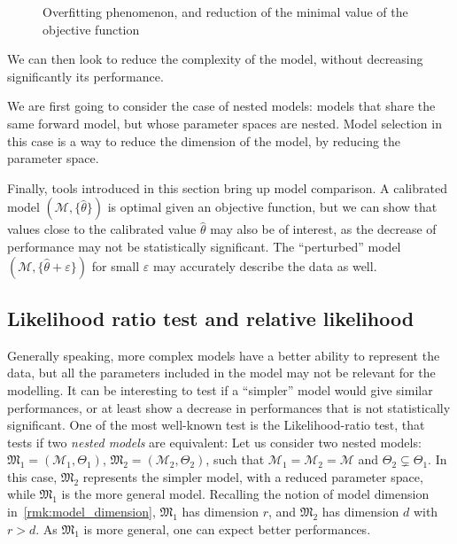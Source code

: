 \documentclass[../../Main_ManuscritThese.tex]{subfiles}
\newcommand\imgpath{/home/victor/acadwriting/Manuscrit/Text/Chapter2/img/}
\begin{document}
\begin{figure}[ht]
  \centering
  
  \caption[Example of overfitting phenomenon]{\label{fig:overfitting} Overfitting phenomenon, and reduction of the minimal value of the objective function}
\end{figure}


We can then look to reduce the complexity of the model, without decreasing significantly its performance.

We are first going to consider the case of nested models: models that share the same forward model, but whose parameter spaces are nested. Model selection in this case is a way to reduce the dimension of the model, by reducing the parameter space.

Finally, tools introduced in this section bring up model comparison. A calibrated model $(\mathcal{M},\{\hat{\theta}\})$ is optimal given an objective function, but we can show that values close to the calibrated value $\hat{\theta}$ may also be of interest, as the decrease of performance may not be statistically significant. The ``perturbed'' model $(\mathcal{M}, \{\hat{\theta} + \varepsilon\})$ for small $\varepsilon$ may accurately describe the data as well.

\subsection{Likelihood ratio test and relative likelihood}
\label{sec:likelihood_ratio_test}
Generally speaking, more complex models have a better ability to represent the data, but all the parameters included in the model may not be relevant for the modelling. It can be interesting to test if a ``simpler'' model would give similar performances, or at least show a decrease in performances that is not statistically significant.
One of the most well-known test is the Likelihood-ratio test, that tests if two \emph{nested models} are equivalent:
Let us consider two nested models: $\mathfrak{M}_1 = (\mathcal{M}_1, \Theta_1)$, $\mathfrak{M}_2= (\mathcal{M}_2,\Theta_2)$, such that $\mathcal{M}_1=\mathcal{M}_2=\mathcal{M}$ and $\Theta_2 \subsetneq \Theta_1$. In this case, $\mathfrak{M}_2$ represents the simpler model, with a reduced parameter space, while $\mathfrak{M}_1$ is the more general model. Recalling the notion of model dimension in~\cref{rmk:model_dimension},  $\mathfrak{M}_1$ has dimension $r$, and $\mathfrak{M}_2$ has dimension $d$ with $r>d$.
As $\mathfrak{M}_1$ is more general, one can expect better performances.
\end{document}
